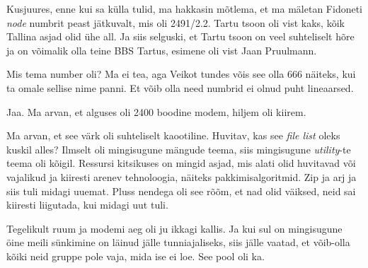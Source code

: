 Kusjuures, enne kui sa külla tulid, ma hakkasin mõtlema, et ma mäletan Fidoneti 
\emph{node} numbrit peast jätkuvalt, mis oli 2491/2.2. Tartu tsoon oli vist 
kaks, kõik Tallina asjad olid ühe all. Ja siis selguski, et Tartu tsoon on veel 
suhteliselt hõre ja on võimalik olla teine BBS Tartus, esimene oli vist Jaan 
Pruulmann.


Mis tema number oli? Ma ei tea, aga Veikot tundes võis see olla 666 näiteks, kui ta omale 
sellise nime panni. Et võib olla need numbrid ei olnud puht lineaarsed. 


Jaa. Ma arvan, et alguses oli 2400 boodine modem, hiljem oli kiirem.


Ma arvan, et see värk oli suhteliselt kaootiline. Huvitav, kas see \emph{file 
list} oleks kuskil alles? Ilmselt oli mingisugune mängude teema, siis 
mingisugune \emph{utility}-te teema oli kõigil. Ressursi kitsikuses on mingid 
asjad, mis alati olid  huvitavad või vajalikud ja kiiresti arenev tehnoloogia, näiteks 
pakkimisalgoritmid. Zip ja arj ja siis tuli midagi uuemat. Pluss  nendega 
oli see rõõm, et nad olid väiksed, neid sai kiiresti liigutada, kui midagi uut 
tuli.


Tegelikult ruum ja modemi aeg oli ju ikkagi kallis. Ja kui sul on mingisugune 
öine meili sünkimine on läinud jälle tunniajaliseks, siis jälle vaatad, et 
võib-olla kõiki neid gruppe pole vaja, mida ise ei loe. See pool oli ka. 


